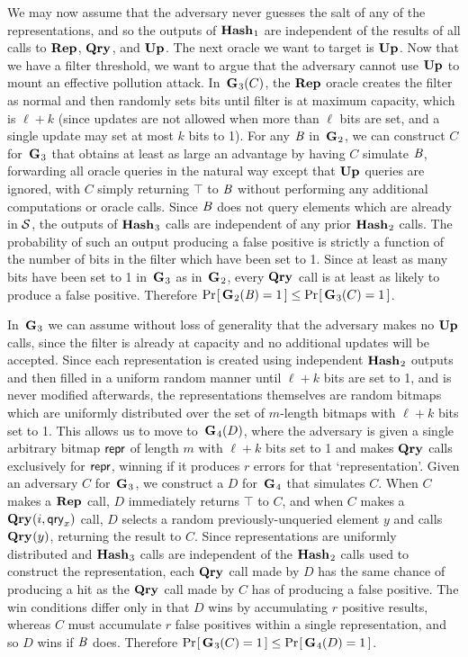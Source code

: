 We may now assume that the adversary never guesses the salt of any of the representations, and so the outputs of $\textup{\textbf{Hash}}\hspace{0.5pt}_1$ are independent of the results of all calls to $\textup{\textbf{Rep}}\hspace{0.5pt}$, $\textup{\textbf{Qry}}\hspace{0.5pt}$, and $\textup{\textbf{Up}}\hspace{0.5pt}$. The next oracle we want to target is $\textup{\textbf{Up}}\hspace{0.5pt}$. Now that we have a filter threshold, we want to argue that the adversary cannot use $\textup{\textbf{Up}}\hspace{0.5pt}$ to mount an effective pollution attack. In~$\textup{\textbf{G}}\hspace{0.5pt}_3(C)$, the $\textup{\textbf{Rep}}\hspace{0.5pt}$ oracle creates the filter as normal and then randomly sets bits until filter is at maximum capacity, which is $\ell+k$ (since updates are not allowed when more than $\ell$ bits are set, and a single update may set at most $k$ bits to 1). For any $\mathit{B}$ in~$\textup{\textbf{G}}\hspace{0.5pt}_2$, we can construct $C$ for~$\textup{\textbf{G}}\hspace{0.5pt}_3$ that obtains at least as large an advantage by having $C$ simulate $\mathit{B}$, forwarding all oracle queries in the natural way except that $\textup{\textbf{Up}}\hspace{0.5pt}$ queries are ignored, with $C$ simply returning $\top$ to $\mathit{B}$ without performing any additional computations or oracle calls. Since $\mathit{B}$ does not query elements which are already in $\mathcal{S}$, the outputs of $\textup{\textbf{Hash}}\hspace{0.5pt}_3$ calls are independent of any prior $\textup{\textbf{Hash}}\hspace{0.5pt}_2$ calls. The probability of such an output producing a false positive is strictly a function of the number of bits in the filter which have been set to 1. Since at least as many bits have been set to 1 in~$\textup{\textbf{G}}\hspace{0.5pt}_3$ as in~$\textup{\textbf{G}}\hspace{0.5pt}_2$, every $\textup{\textbf{Qry}}\hspace{0.5pt}$ call is at least as likely to produce a false positive. Therefore $\Pr\hspace{-1pt}\left[\,\textup{\textbf{G}}\hspace{0.5pt}_2(\mathit{B}) = 1\,\right] \le \Pr\hspace{-1pt}\left[\,\textup{\textbf{G}}\hspace{0.5pt}_3(C) = 1\,\right]$.

In~$\textup{\textbf{G}}\hspace{0.5pt}_3$ we can assume without loss of generality that the adversary makes no $\textup{\textbf{Up}}\hspace{0.5pt}$ calls, since the filter is already at capacity and no additional updates will be accepted. Since each representation is created using independent $\textup{\textbf{Hash}}\hspace{0.5pt}_2$ outputs and then filled in a uniform random manner until $\ell+k$ bits are set to 1, and is never modified afterwards, the representations themselves are random bitmaps which are uniformly distributed over the set of $m$-length bitmaps with $\ell+k$ bits set to 1. This allows us to move to~$\textup{\textbf{G}}\hspace{0.5pt}_4(D)$, where the adversary is given a single arbitrary bitmap $\mathsf{repr}$ of length $m$ with $\ell+k$ bits set to 1 and makes $\textup{\textbf{Qry}}\hspace{0.5pt}$ calls exclusively for $\mathsf{repr}$, winning if it produces $r$ errors for that `representation'. Given an adversary $C$ for~$\textup{\textbf{G}}\hspace{0.5pt}_3$, we construct a $D$ for~$\textup{\textbf{G}}\hspace{0.5pt}_4$ that simulates $C$. When $C$ makes a $\textup{\textbf{Rep}}\hspace{0.5pt}$ call, $D$ immediately returns $\top$ to $C$, and when $C$ makes a $\textup{\textbf{Qry}}\hspace{0.5pt}(i,\mathsf{qry}_x)$ call, $D$ selects a random previously-unqueried element $y$ and calls $\textup{\textbf{Qry}}\hspace{0.5pt}(y)$, returning the result to $C$. Since representations are uniformly distributed and $\textup{\textbf{Hash}}\hspace{0.5pt}_3$ calls are independent of the $\textup{\textbf{Hash}}\hspace{0.5pt}_2$ calls used to construct the representation, each $\textup{\textbf{Qry}}\hspace{0.5pt}$ call made by $D$ has the same chance of producing a hit as the $\textup{\textbf{Qry}}\hspace{0.5pt}$ call made by $C$ has of producing a false positive. The win conditions differ only in that $D$ wins by accumulating $r$ positive results, whereas $C$ must accumulate $r$ false positives within a single representation, and so $D$ wins if $\mathit{B}$ does. Therefore $\Pr\hspace{-1pt}\left[\,\textup{\textbf{G}}\hspace{0.5pt}_3(C) = 1\,\right] \le \Pr\hspace{-1pt}\left[\,\textup{\textbf{G}}\hspace{0.5pt}_4(D) = 1\,\right]$.

